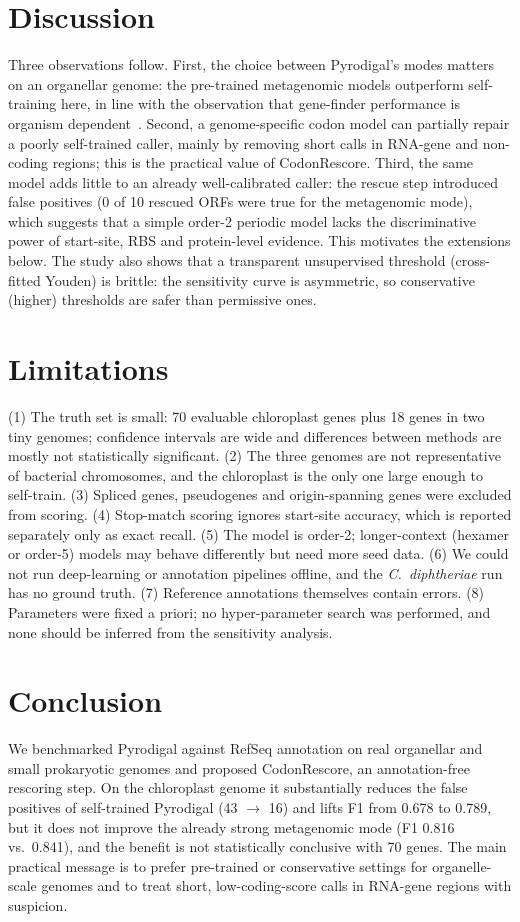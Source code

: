 \section{Discussion}
Three observations follow. First, the choice between Pyrodigal's modes matters on an organellar genome: the pre-trained metagenomic models outperform self-training here, in line with the observation that gene-finder performance is organism dependent~\cite{dimonaco2022}. Second, a genome-specific codon model can partially repair a poorly self-trained caller, mainly by removing short calls in RNA-gene and non-coding regions; this is the practical value of CodonRescore. Third, the same model adds little to an already well-calibrated caller: the rescue step introduced false positives (0 of 10 rescued ORFs were true for the metagenomic mode), which suggests that a simple order-2 periodic model lacks the discriminative power of start-site, RBS and protein-level evidence. This motivates the extensions below. The study also shows that a transparent unsupervised threshold (cross-fitted Youden) is brittle: the sensitivity curve is asymmetric, so conservative (higher) thresholds are safer than permissive ones.

\section{Limitations}
(1) The truth set is small: 70 evaluable chloroplast genes plus 18 genes in two tiny genomes; confidence intervals are wide and differences between methods are mostly not statistically significant. (2) The three genomes are not representative of bacterial chromosomes, and the chloroplast is the only one large enough to self-train. (3) Spliced genes, pseudogenes and origin-spanning genes were excluded from scoring. (4) Stop-match scoring ignores start-site accuracy, which is reported separately only as exact recall. (5) The model is order-2; longer-context (hexamer or order-5) models may behave differently but need more seed data. (6) We could not run deep-learning or annotation pipelines offline, and the \textit{C.\ diphtheriae} run has no ground truth. (7) Reference annotations themselves contain errors. (8) Parameters were fixed a priori; no hyper-parameter search was performed, and none should be inferred from the sensitivity analysis.

\section{Conclusion}
We benchmarked Pyrodigal against RefSeq annotation on real organellar and small prokaryotic genomes and proposed CodonRescore, an annotation-free rescoring step. On the chloroplast genome it substantially reduces the false positives of self-trained Pyrodigal (43 $\rightarrow$ 16) and lifts F1 from 0.678 to 0.789, but it does not improve the already strong metagenomic mode (F1 0.816 vs.\ 0.841), and the benefit is not statistically conclusive with 70 genes. The main practical message is to prefer pre-trained or conservative settings for organelle-scale genomes and to treat short, low-coding-score calls in RNA-gene regions with suspicion.

